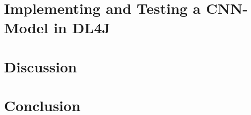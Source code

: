 \documentclass[a4paper, english]{scrreprt}
\begin{document}


\onehalfspacing




\setcounter{tocdepth}{3}
\setcounter{secnumdepth}{3}
\tableofcontents









\chapter{Implementing and Testing a CNN-Model in DL4J}

\chapter{Discussion}

\chapter{Conclusion}

\printbibliography

\listoffigures
\end{document}
